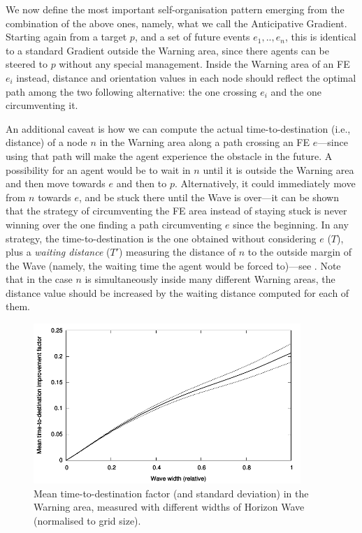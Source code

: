 \documentclass[12pt,a4paper,twoside,openright]{book}
\begin{document}
We now define the most important self-organisation pattern emerging from the combination of the above ones, namely, what we call the Anticipative Gradient.
%
Starting again from a target $p$, and a set of future events $e_1,..,e_n$, this is identical to a standard Gradient outside the Warning area, since there agents can be steered to $p$ without any special management.
%
Inside the Warning area of an FE $e_i$ instead, distance and orientation values in each node should reflect the optimal path among the two following alternative: the one crossing $e_i$ and the one circumventing it.

An additional caveat is how we can compute the actual time-to-destination (i.e., distance) of a node $n$ in the Warning area along a path crossing an FE $e$---since using that path will make the agent experience the obstacle in the future.
%
A possibility for an agent would be to wait in $n$ until it is outside the Warning area and then move towards $e$ and then to $p$. 
%
Alternatively, it could immediately move from $n$ towards $e$, and be stuck there until the Wave is over---it can be shown that the strategy of circumventing the FE area instead of staying stuck is never winning over the one finding a path circumventing $e$ since the beginning.
%
In any strategy, the time-to-destination is the one obtained without considering $e$ ($T$), plus a \emph{waiting distance} ($T'$) measuring the distance of $n$ to the outside margin of the Wave (namely, the waiting time the agent would be forced to)---see .
%
Note that in the case $n$ is simultaneously inside many different Warning areas, the distance value should be increased by the waiting distance computed for each of them.

\begin{figure}
	\begin{center}
		\includegraphics[width=0.9\textwidth]{img/processed}
\end{center}
\caption[Anticipative Gradient performance]{Mean time-to-destination factor (and standard deviation) in the Warning area, measured with different widths of Horizon Wave (normalised to grid size).}
\label{fig:sims}
\end{figure}
\end{document}
